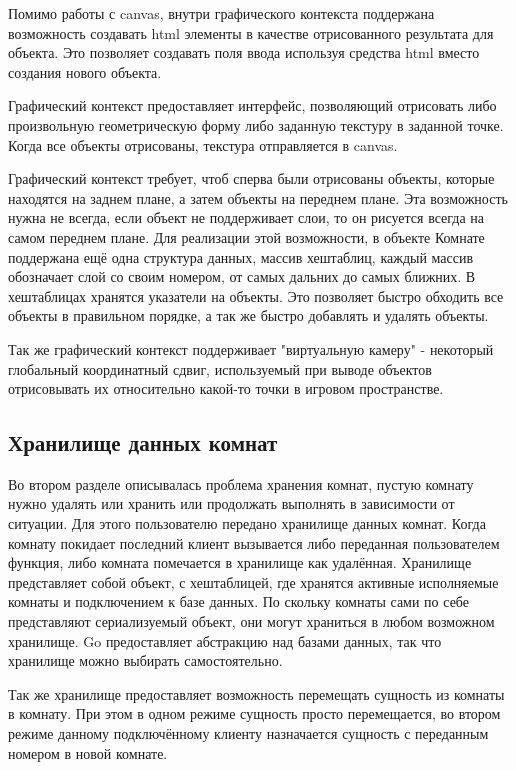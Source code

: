 \documentclass[a4paper,14pt, openany]{book}
\begin{document}
Помимо работы с canvas, внутри графического контекста поддержана возможность создавать html элементы в качестве отрисованного результата для объекта. Это позволяет создавать поля ввода используя средства html вместо создания нового объекта. 

Графический контекст предоставляет интерфейс, позволяющий отрисовать либо произвольную геометрическую форму либо заданную текстуру в заданной точке. Когда все объекты отрисованы, текстура отправляется в canvas.

Графический контекст требует, чтоб сперва были отрисованы объекты, которые находятся на заднем плане, а затем объекты на переднем плане. Эта возможность нужна не всегда, если объект не поддерживает слои, то он рисуется всегда на самом переднем плане. Для реализации этой возможности, в объекте Комнате поддержана ещё одна структура данных, массив хештаблиц, каждый массив обозначает слой со своим номером, от самых дальних до самых ближних. В хештаблицах хранятся указатели на объекты. Это позволяет быстро обходить все объекты в правильном порядке, а так же быстро добавлять и удалять объекты.

Так же графический контекст поддерживает "виртуальную камеру"  - некоторый глобальный координатный сдвиг, используемый при выводе объектов отрисовывать их относительно какой-то точки в игровом пространстве. 


\subsection{Хранилище данных комнат}

Во втором разделе описывалась проблема хранения комнат, пустую комнату нужно удалять или хранить или продолжать выполнять в зависимости от ситуации. Для этого пользователю передано хранилище данных комнат. Когда комнату покидает последний клиент вызывается либо переданная пользователем функция, либо комната помечается в хранилище как удалённая. Хранилище представляет собой объект, с хештаблицей, где хранятся активные исполняемые комнаты и подключением к базе данных. По скольку комнаты сами по себе представляют сериализуемый объект, они могут храниться в любом возможном хранилище. Go предоставляет абстракцию над базами данных, так что хранилище можно выбирать самостоятельно.

Так же хранилище предоставляет возможность перемещать сущность из комнаты в комнату. При этом в одном режиме сущность просто перемещается, во втором режиме данному подключённому клиенту назначается сущность с
переданным номером в новой комнате.
\end{document}
